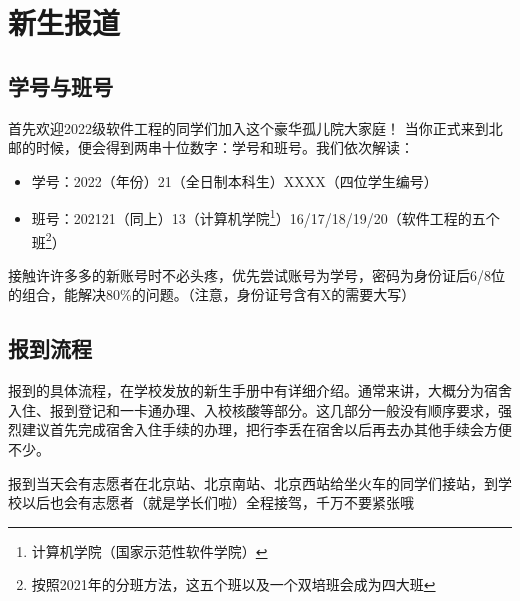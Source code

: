 \section{新生报道}

\subsection*{学号与班号}

首先欢迎2022级软件工程的同学们加入这个豪华孤儿院大家庭！
当你正式来到北邮的时候，便会得到两串十位数字：学号和班号。我们依次解读：
\begin{itemize}
    \kaishu
    \item 学号：2022（年份）21（全日制本科生）XXXX（四位学生编号）
    \item 班号：202121（同上）13（计算机学院\footnote{计算机学院（国家示范性软件学院）}）16/17/18/19/20（软件工程的五个班\footnote{按照2021年的分班方法，这五个班以及一个双培班会成为四大班}）
\end{itemize}

接触许许多多的新账号时不必头疼，优先尝试账号为学号，密码为身份证后6/8位的组合，能解决80\%的问题。（注意，身份证号含有X的需要大写）

\subsection*{报到流程}


报到的具体流程，在学校发放的新生手册中有详细介绍。通常来讲，大概分为宿舍入住、报到登记和一卡通办理、入校核酸等部分。这几部分一般没有顺序要求，强烈建议首先完成宿舍入住手续的办理，把行李丢在宿舍以后再去办其他手续会方便不少。

报到当天会有志愿者在北京站、北京南站、北京西站给坐火车的同学们接站，到学校以后也会有志愿者（就是学长们啦）全程接驾，千万不要紧张哦~

